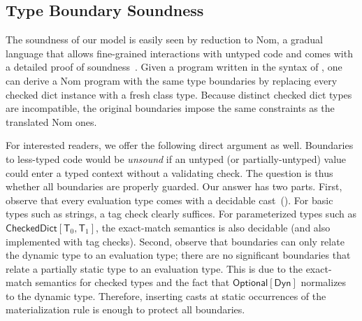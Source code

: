 \documentclass[english,cleveref,crc]{programming}
\newcommand{\code}[1]{\texttt{#1}}
\newcommand{\spapp}[2]{#1\,(#2)}
\newcommand{\spann}[2]{#1\!:\!#2}
\newcommand{\typefont}[1]{\mathsf{#1}}
\newcommand{\codefont}[1]{\emph{#1}}
\newcommand{\paramtype}[2]{#1[#2]}
\newcommand{\spteval}{\typefont{T}}
\newcommand{\sptclass}{\typefont{C}}
\newcommand{\sptdyn}{\typefont{Dyn}}
\newcommand{\sptoptional}[1]{\paramtype{\typefont{Optional}}{#1}}
\newcommand{\sptrawchkdict}{\typefont{CheckedDict}} %
\newcommand{\sptchkdict}[2]{\paramtype{\sptrawchkdict}{#1, #2}}
\newcommand{\sptenv}{\Gamma} %
\newcommand{\sptvardef}[2]{\spann{#1}{#2}}
\newcommand{\spx}{\code{x}}
\newcommand{\spf}{\code{f}}
\newcommand{\spc}{\sptclass}
\newcommand{\spexpr}{\codefont{expr}}
\newcommand{\vdashsub}[1]{\vdash_{#1}}
\newcommand{\wtprog}{\vdashsub{\mathbf{P}}}
\newcommand{\wtexpr}{\vdashsub{\mathbf{E}}}
\newcommand{\spvardef}[3]{\sptvardef{#1}{#2} = #3}
\newcommand{\spfundef}[4]{\mathrm{def}~\spapp{#1}{#2}\code{ -> }#3: #4}
\newcommand{\spclassdef}[4]{\mathrm{class}~\spapp{#1}{#2}:~#3;~#4}
\newcommand{\spself}{\code{self}}
\begin{document}
%


\subsection{Type Boundary Soundness}
\label{s:ts}

The soundness of our model is easily seen by reduction to Nom, a gradual
language that allows fine-grained interactions with untyped code and comes with
a detailed proof of soundness~\cite{mt-oopsla-2017,mt-oopsla-2021}.
Given a program written in the syntax of , one can derive
a Nom program with the same type boundaries by replacing every checked
dict instance with a fresh class type.
Because distinct checked dict types are incompatible, the
original boundaries impose the same constraints as the translated Nom ones.

For interested readers, we offer the following direct argument as well.
Boundaries to less-typed code would be \emph{unsound} if an untyped
(or partially-untyped) value could enter a typed context without
a validating check.
The question is thus whether all boundaries are properly guarded.
Our answer has two parts.
First, observe that every evaluation type comes with a decidable
cast~().
For basic types such as strings, a tag check clearly suffices.
For parameterized types such as $\sptchkdict{\spteval_0}{\spteval_1}$,
the exact-match semantics is also decidable (and also implemented with
tag checks).
Second, observe that boundaries can only relate the dynamic type to an
evaluation type; there are no significant boundaries that relate a partially
static type to an evaluation type.
This is due to the exact-match semantics for checked types and the fact that
$\sptoptional{\sptdyn}$ normalizes to the dynamic type.
Therefore, inserting casts at static occurrences of the materialization rule is
enough to protect all boundaries.
\end{document}
